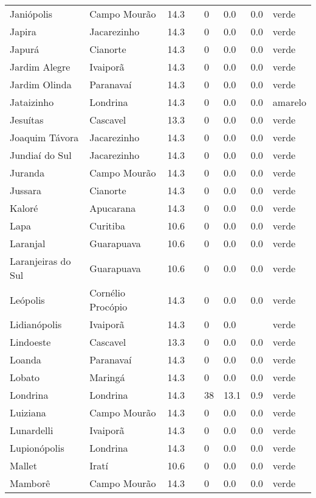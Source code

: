 \begin{longtable}{l|lllllll}
  Janiópolis & Campo Mourão & 14.3 &  & 0 & 0.0 & 0.0 & verde \\ 
  Japira & Jacarezinho & 14.3 &  & 0 & 0.0 & 0.0 & verde \\ 
  Japurá & Cianorte & 14.3 &  & 0 & 0.0 & 0.0 & verde \\ 
  Jardim Alegre & Ivaiporã & 14.3 &  & 0 & 0.0 & 0.0 & verde \\ 
  Jardim Olinda & Paranavaí & 14.3 &  & 0 & 0.0 & 0.0 & verde \\ 
  Jataizinho & Londrina & 14.3 &  & 0 & 0.0 & 0.0 & amarelo \\ 
  Jesuítas & Cascavel & 13.3 &  & 0 & 0.0 & 0.0 & verde \\ 
  Joaquim Távora & Jacarezinho & 14.3 &  & 0 & 0.0 & 0.0 & verde \\ 
  Jundiaí do Sul & Jacarezinho & 14.3 &  & 0 & 0.0 & 0.0 & verde \\ 
  Juranda & Campo Mourão & 14.3 &  & 0 & 0.0 & 0.0 & verde \\ 
  Jussara & Cianorte & 14.3 &  & 0 & 0.0 & 0.0 & verde \\ 
  Kaloré & Apucarana & 14.3 &  & 0 & 0.0 & 0.0 & verde \\ 
  Lapa & Curitiba & 10.6 &  & 0 & 0.0 & 0.0 & verde \\ 
  Laranjal & Guarapuava & 10.6 &  & 0 & 0.0 & 0.0 & verde \\ 
  Laranjeiras do Sul & Guarapuava & 10.6 &  & 0 & 0.0 & 0.0 & verde \\ 
  Leópolis & Cornélio Procópio & 14.3 &  & 0 & 0.0 & 0.0 & verde \\ 
  Lidianópolis & Ivaiporã & 14.3 &  & 0 & 0.0 &  & verde \\ 
  Lindoeste & Cascavel & 13.3 &  & 0 & 0.0 & 0.0 & verde \\ 
  Loanda & Paranavaí & 14.3 &  & 0 & 0.0 & 0.0 & verde \\ 
  Lobato & Maringá & 14.3 &  & 0 & 0.0 & 0.0 & verde \\ 
  Londrina & Londrina & 14.3 &  & 38 & 13.1 & 0.9 & verde \\ 
  Luiziana & Campo Mourão & 14.3 &  & 0 & 0.0 & 0.0 & verde \\ 
  Lunardelli & Ivaiporã & 14.3 &  & 0 & 0.0 & 0.0 & verde \\ 
  Lupionópolis & Londrina & 14.3 &  & 0 & 0.0 & 0.0 & verde \\ 
  Mallet & Iratí & 10.6 &  & 0 & 0.0 & 0.0 & verde \\ 
  Mamborê & Campo Mourão & 14.3 &  & 0 & 0.0 & 0.0 & verde \\ 

\end{longtable}
